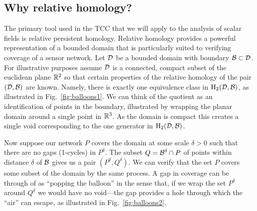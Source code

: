 
\subsection{Why relative homology?}

The primary tool used in the TCC that we will apply to the analysis of scalar fields is relative persistent homology.
Relative homology provides a powerful representation of a bounded domain that is particularly suited to verifying coverage of a sensor network.
Let ${\mathcal{D}}$ be a bounded domain with boundary ${\mathcal{B}}\subset{\mathcal{D}}$.
For illustrative purposes assume ${\mathcal{D}}$ is a connected, compact subset of the euclidean plane $\mathbb{R}^2$ so that certain properties of the relative homology of the pair $({\mathcal{D}}, {\mathcal{B}})$ are known.
Namely, there is exactly one equivalence class in $\mathrm{H}_2({\mathcal{D}}, {\mathcal{B}})$, as illustrated in Fig.~\ref{fig:balloons1}.
We can think of the quotient as an identification of points in the boundary, illustrated by wrapping the planar domain around a single point in $\mathbb{R}^3$.
As the domain is compact this creates a single void corresponding to the one generator in $\mathrm{H}_2({\mathcal{D}}, {\mathcal{B}})$.


Now suppose our network $P$ covers the domain at some scale $\delta > 0$ such that there are no gaps (1-cycles) in $P^\delta$.
The subset $Q = {\mathcal{B}}^\delta \cap P$ of points within distance $\delta$ of ${\mathcal{B}}$ gives us a pair $(P^\delta, Q^\delta)$.
We can verify that the set $P$ covers some subset of the domain by the same process.
A gap in coverage can be through of as ``popping the balloon'' in the sense that, if we wrap the set $P^\delta$ around $Q^\delta$ we would have no void---the gap provides a hole through which the ``air'' can escape, as illustrated in Fig.~\ref{fig:balloons2}.

